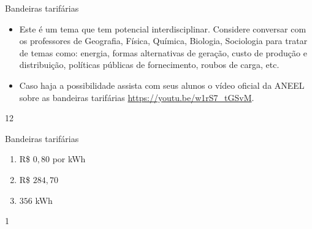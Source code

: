 \begin{sugestions}{Bandeiras tarifárias}
{
\begin{itemize}
\item Este é um tema que tem potencial interdisciplinar. Considere conversar com os professores de Geografia, Física, Química, Biologia, Sociologia para tratar de temas como: energia, formas alternativas de geração, custo de produção e distribuição, políticas públicas de fornecimento, roubos de carga, etc.

\item Caso haja a possibilidade assista com seus alunos o vídeo oficial da ANEEL sobre as bandeiras tarifárias \url{https://youtu.be/w1rS7_tGSvM}.
\end{itemize}
}{1}{2}
\end{sugestions}
\begin{answer}{Bandeiras tarifárias}
{

\begin{enumerate}
\item R\$ $0{,}80$ por kWh
\item R\$ $284{,}70$
\item $356$ kWh
\end{enumerate}
}{1}
\end{answer}
\phantom{M}
\vspace{-1em}

